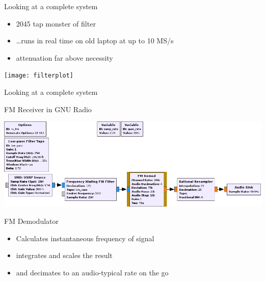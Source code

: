 \documentclass{beamer}
\begin{document}
\begin{frame}{Looking at a complete system}

  {\begin{itemize}
    \item 2045 tap monster of filter
    \item \ldots runs in real time on old laptop at up to 10 MS/s
    \item attenuation far above necessity
  \end{itemize}}
  {\texttt{[image: filterplot]}}

\end{frame}
\begin{frame}{Looking at a complete system}

  FM Receiver in GNU Radio \bigskip

  {\includegraphics[width=\textwidth]{fg_fm_demod}}


  FM Demodulator

  {\begin{itemize}
    \item Calculates instantaneous frequency of signal
    \item integrates and scales the result
    \item and decimates to an audio-typical rate on the go
  \end{itemize}}

\end{frame}
\end{document}

